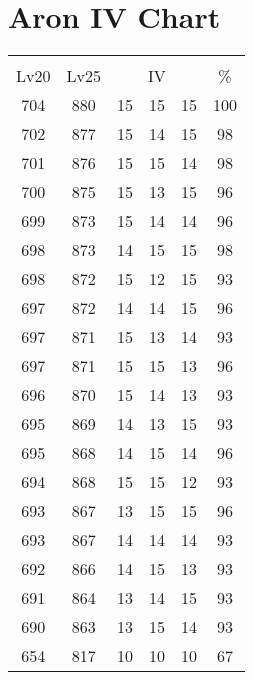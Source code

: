 \documentclass{article}%
\begin{document}
%
\normalsize%
\section{Aron IV Chart}%
\label{sec:Aron IV Chart}%
\renewcommand{\arraystretch}{1.5}%
\begin{tabular}{|c|c|c|c|c|c|}%
\hline%
\multicolumn{6}{|c|}{\textcolor{white}{ 
\linebreak{Aron}
}%
\cellcolor{black}}\\%
\multicolumn{1}{|c}{Lv20}&\multicolumn{1}{c|}{Lv25}&\multicolumn{3}{c|}{IV}&\multicolumn{1}{|c|}{\%}\\%
\hline%
\rowcolor{color100}%
704&880&15&15&15&100\\%
\hline%
\rowcolor{color98}%
702&877&15&14&15&98\\%
\hline%
\rowcolor{color98}%
701&876&15&15&14&98\\%
\hline%
\rowcolor{color96}%
700&875&15&13&15&96\\%
\hline%
\rowcolor{color96}%
699&873&15&14&14&96\\%
\hline%
\rowcolor{color98}%
698&873&14&15&15&98\\%
\hline%
\rowcolor{color93}%
698&872&15&12&15&93\\%
\hline%
\rowcolor{color96}%
697&872&14&14&15&96\\%
\hline%
\rowcolor{color93}%
697&871&15&13&14&93\\%
\hline%
\rowcolor{color96}%
697&871&15&15&13&96\\%
\hline%
\rowcolor{color93}%
696&870&15&14&13&93\\%
\hline%
\rowcolor{color93}%
695&869&14&13&15&93\\%
\hline%
\rowcolor{color96}%
695&868&14&15&14&96\\%
\hline%
\rowcolor{color93}%
694&868&15&15&12&93\\%
\hline%
\rowcolor{color96}%
693&867&13&15&15&96\\%
\hline%
\rowcolor{color93}%
693&867&14&14&14&93\\%
\hline%
\rowcolor{color93}%
692&866&14&15&13&93\\%
\hline%
\rowcolor{color93}%
691&864&13&14&15&93\\%
\hline%
\rowcolor{color93}%
690&863&13&15&14&93\\%
\hline%
\rowcolor{color91}%
654&817&10&10&10&67\\%
\end{tabular}

%
\end{document}
